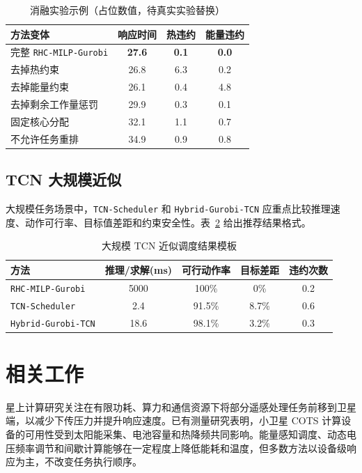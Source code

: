 \documentclass[conference]{IEEEtran}
\newcommand{\rhc}{\texttt{RHC-MILP-Gurobi}}
\newcommand{\tcns}{\texttt{TCN-Scheduler}}
\newcommand{\hybrid}{\texttt{Hybrid-Gurobi-TCN}}
\begin{document}
\begin{table}[t]
\centering
\caption{消融实验示例（占位数值，待真实实验替换）}
\label{tab:ablation}
\begin{tabular}{lccc}
\toprule
方法变体 & 响应时间 & 热违约 & 能量违约 \\
\midrule
完整 \rhc{} & \textbf{27.6} & \textbf{0.1} & \textbf{0.0} \\
去掉热约束 & 26.8 & 6.3 & 0.2 \\
去掉能量约束 & 26.1 & 0.4 & 4.8 \\
去掉剩余工作量惩罚 & 29.9 & 0.3 & 0.1 \\
固定核心分配 & 32.1 & 1.1 & 0.7 \\
不允许任务重排 & 34.9 & 0.9 & 0.8 \\
\bottomrule
\end{tabular}
\end{table}

\subsection{TCN 大规模近似}

大规模任务场景中，\tcns{} 和 \hybrid{} 应重点比较推理速度、动作可行率、目标值差距和约束安全性。表~\ref{tab:tcn-results} 给出推荐结果格式。

\begin{table}[t]
\centering
\caption{大规模 TCN 近似调度结果模板}
\label{tab:tcn-results}
\begin{tabular}{lcccc}
\toprule
方法 & 推理/求解(ms) & 可行动作率 & 目标差距 & 违约次数 \\
\midrule
\rhc{} & 5000 & 100\% & 0\% & 0.2 \\
\tcns{} & 2.4 & 91.5\% & 8.7\% & 0.6 \\
\hybrid{} & 18.6 & 98.1\% & 3.2\% & 0.3 \\
\bottomrule
\end{tabular}
\end{table}

\section{相关工作}

星上计算研究关注在有限功耗、算力和通信资源下将部分遥感处理任务前移到卫星端，以减少下传压力并提升响应速度。已有测量研究表明，小卫星 COTS 计算设备的可用性受到太阳能采集、电池容量和热降频共同影响。能量感知调度、动态电压频率调节和间歇计算能够在一定程度上降低能耗和温度，但多数方法以设备级响应为主，不改变任务执行顺序。
\end{document}
